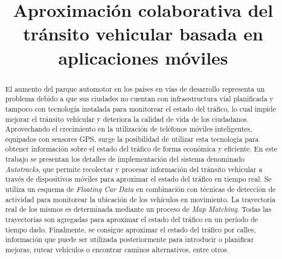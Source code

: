 \documentclass[conference,spanish]{IEEEtran}
\begin{document}
    \renewcommand{\lstlistingname}{\textbf{Consulta}}
    \renewcommand\tablename{Tabla}
  
	\title{Aproximación colaborativa del tránsito vehicular basada en aplicaciones móviles}
	
	\author{
		\and
		\and
		}

	\maketitle
	
	\begin{abstract}
El aumento del parque automotor en los países en vías de desarrollo representa un problema debido a que sus ciudades no cuentan con infraestructura vial planificada y tampoco con tecnología instalada para monitorear el estado del tráfico, lo cual impide mejorar el tránsito vehícular y deteriora la calidad de vida de los ciudadanos. Aprovechando el crecimiento en la utilización de teléfonos móviles inteligentes, equipados con sensores GPS, surge la posibilidad de utilizar esta tecnología para obtener información sobre el estado del tráfico de forma económica y eficiente. En este trabajo se presentan los detalles de implementación del sistema denominado \emph{Autotracks}, que permite recolectar y procesar información del tránsito vehicular a través de dispositivos móviles para aproximar el estado del tráfico en tiempo real. Se utiliza un esquema de \emph{Floating Car Data} en combinación con técnicas de detección de actividad para monitorear la ubicación de los vehículos en movimiento. La trayectoria real de los mismos es determinada mediante un proceso de \emph{Map Matching}. Todas las trayectorias son agregadas para aproximar el estado del tráfico en un período de tiempo dado. Finalmente, se consigue aproximar el estado del tráfico por calles, información que puede ser utilizada posteriormente para introducir o planificar mejoras, rutear vehículos o encontrar caminos alternativos, entre otros.
	\end{abstract}
	
\end{document}
